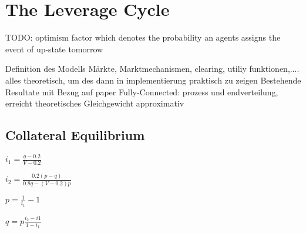 \documentclass[../Bachelorarbeit.tex]{subfiles}
\begin{document}
\chapter{The Leverage Cycle}
\label{ch:leverageCycle}

TODO: optimism factor which denotes the probability an agents assigns the event of up-state tomorrow

Definition des Modells
		Märkte, Marktmechanismen, clearing, utiliy funktionen,....
		alles theoretisch, um des dann in implementierung praktisch zu zeigen
	Bestehende Resultate mit Bezug auf paper
		Fully-Connected: prozess und endverteilung, erreicht theoretisches Gleichgewicht approximativ

\section{Collateral Equilibrium}
\label{sec:collateralEquilibrium}

\begin{center}
$i_{1} = \frac{q - 0.2}{V - 0.2}$
\end{center}

\begin{center}
$i_{2} = \frac{0.2(p - q)}{0.8q - (V - 0.2)p}$
\end{center}

\begin{center}
$p = \frac{1}{i_{1}} - 1$
\end{center}

\begin{center}
$q = p \frac{i_{2} - i{1}}{1 - i_{1}}$
\end{center}
\end{document}
